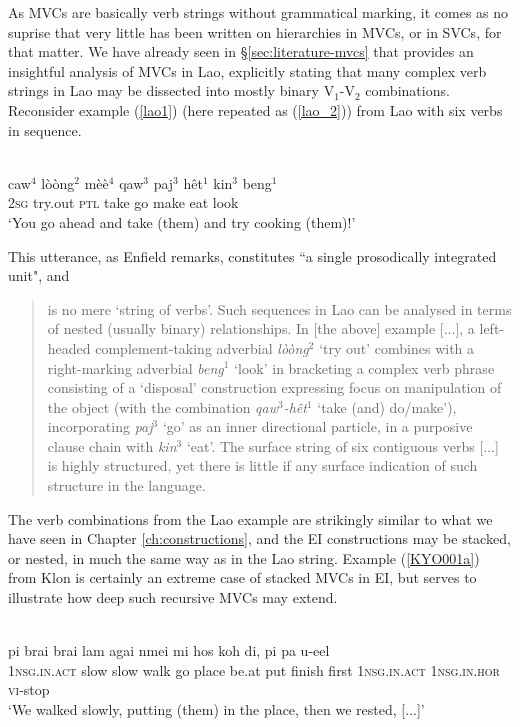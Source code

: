 As MVCs are basically verb strings without grammatical marking, it comes as no suprise that very little has been written on hierarchies in MVCs, or in SVCs, for that matter. We have already seen in §\ref{sec:literature-mvcs} that \citet{enfield2008verbs} provides an insightful analysis of MVCs in Lao, explicitly stating that many complex verb strings in Lao may be dissected into mostly binary V$_1$-V$_2$ combinations. Reconsider example (\ref{lao1}) (here repeated as (\ref{lao_2})) from Lao with six verbs in sequence.

\ea \label{lao_2}
\\
\gll caw$^4$ lòòng$^2$ mèè$^4$ qaw$^3$ paj$^3$ hêt$^1$ kin$^3$ beng$^1$ \\
2\textsc{sg} try.out \textsc{ptl} take go make eat look \\
\glft `You go ahead and take (them) and try cooking (them)!'\\ 
\z

This utterance, as Enfield remarks, constitutes ``a single prosodically integrated unit", and \begin{quote}is no mere `string of verbs'. Such sequences in Lao can be analysed in terms of nested (usually binary) relationships. In [the above] example [...], a left-headed complement-taking adverbial \textit{lòòng$^2$} `try out' combines with a right-marking adverbial \textit{beng$^1$} `look' in bracketing a complex verb phrase consisting of a `disposal' construction expressing focus on manipulation of the object (with the combination \textit{qaw$^3$-hêt$^1$} `take (and) do/make'), incorporating \textit{paj$^3$} `go' as an inner directional particle, in a purposive clause chain with \textit{kin$^3$} `eat'. The surface string of six contiguous verbs [...] is highly structured, yet there is little if any surface indication of such structure in the language. \citep[83]{enfield2008verbs}\end{quote}

The verb combinations from the Lao example are strikingly similar to what we have seen in Chapter \ref{ch:constructions}, and the EI constructions may be stacked, or nested, in much the same way as in the Lao string. Example (\ref{KYO001a}) from Klon is certainly an extreme case of stacked MVCs in EI, but serves to illustrate how deep such recursive MVCs may extend. 

\ea \label{KYO001a}
\\
\gll pi brai brai lam agai nmei mi hos koh di, pi pa u-eel\\
\textsc{1}\textsc{nsg}.\textsc{in}.\textsc{act} slow slow walk go place be.at put finish first \textsc{1}\textsc{nsg}.\textsc{in}.\textsc{act} \textsc{1}\textsc{nsg}.\textsc{in}.\textsc{hor} \textsc{vi}-stop\\
\glft `We walked slowly, putting (them) in the place, then we rested, [...]'\\ 
\z

